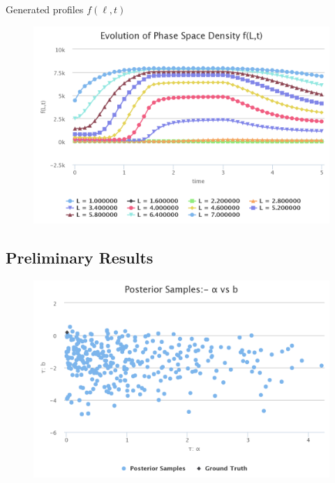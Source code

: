 \documentclass{beamer}
\begin{document}
\begin{frame}{Generated profiles $f(\ell, t)$}
  \begin{figure}[h]
  \includegraphics[width=\textwidth]{psdt_ex1.png}
\end{figure}
\end{frame}


\subsection{Preliminary Results}

\begin{frame}
  \begin{figure}[h]
  \includegraphics[width=\textwidth]{samples1_ex1.png}
  \label{fig:Samples1Ex1}
\end{figure}
\end{frame}
\end{document}
